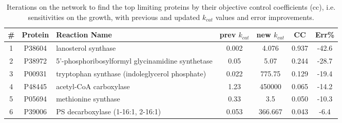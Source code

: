 \begin{table}[H]
  \begin{center}
  \caption[Iterations on the network to find the top limiting proteins by their objective control coefficients (cc), i.e. sensitivities on the growth, with previous and updated $k_{cat}$ values and error improvements]{Iterations on the network to find the top limiting proteins by their objective control coefficients (cc), i.e. sensitivities on the growth, with previous and updated $k_{cat}$ values and error improvements. }
  \baselineskip
  \begin{tabular}{ccp{5cm}cccc}
     \hline
    \textbf{\#} & \textbf{Protein} & \textbf{Reaction Name} & \textbf{prev $k_{cat}$} & \textbf{new $k_{cat}$} & \textbf{CC} & \textbf{Err\%}  \\
      \hline
      1 & P38604 & lanosterol synthase & 0.002 & 4.076 & 0.937 & -42.6 \\ \hline
      2 & P38972 & 5'-phosphoribosylformyl \newline glycinamidine synthetase & 0.05 & 5.07 & 0.244 & -28.7 \\   \hline
      3 & P00931 & tryptophan synthase \newline (indoleglycerol phosphate) & 0.022 & 775.75 & 0.129 & -19.4 \\   \hline
      4 & P48445 & acetyl-CoA carboxylase & 1.23 & 450000 & 0.065 & -14.2 \\   \hline
      5 & P05694 & methionine synthase & 0.33 & 3.5 & 0.050 & -10.3 \\   \hline
      6 & P39006 & PS decarboxylase \newline (1-16:1, 2-16:1) & 0.053 & 366.667 & 0.043 & -6.4 \\   \hline
  \end{tabular}
  \label{table:gecko_iterations}
  \end{center}
\end{table}
